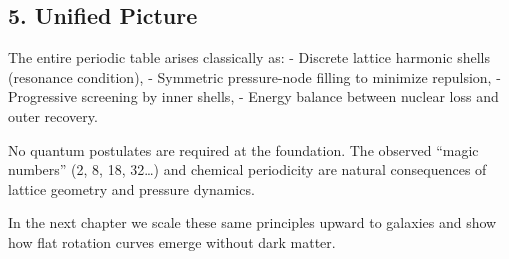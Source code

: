 \documentclass[11pt,a4paper]{book}
\begin{document}
\subsection{5. Unified Picture}
The entire periodic table arises classically as:
- Discrete lattice harmonic shells (resonance condition),
- Symmetric pressure-node filling to minimize repulsion,
- Progressive screening by inner shells,
- Energy balance between nuclear loss and outer recovery.

No quantum postulates are required at the foundation. The observed “magic numbers” (2, 8, 18, 32…) and chemical periodicity are natural consequences of lattice geometry and pressure dynamics.

In the next chapter we scale these same principles upward to galaxies and show how flat rotation curves emerge without dark matter.
\end{document}
